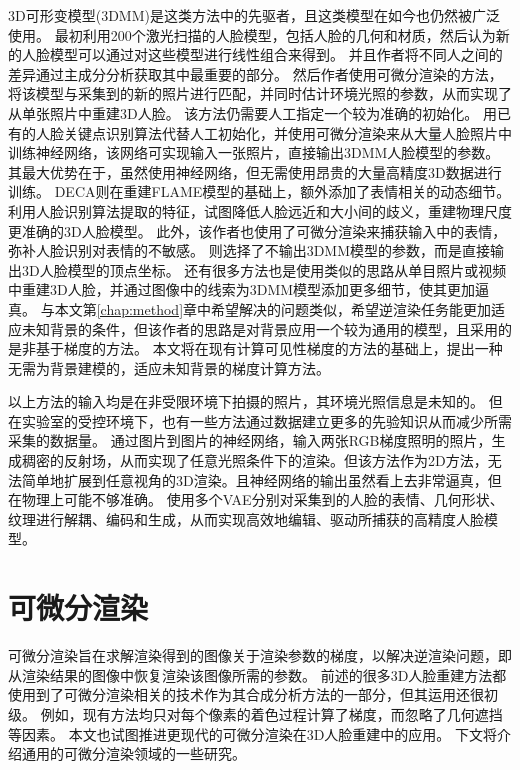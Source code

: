 3D可形变模型(3DMM)是这类方法中的先驱者，且这类模型在如今也仍然被广泛使用。
最初\citet{3DMM}利用200个激光扫描的人脸模型，包括人脸的几何和材质，然后认为新的人脸模型可以通过对这些模型进行线性组合来得到。
并且作者将不同人之间的差异通过主成分分析获取其中最重要的部分。
然后作者使用可微分渲染的方法，将该模型与采集到的新的照片进行匹配，并同时估计环境光照的参数，从而实现了从单张照片中重建3D人脸。
该方法仍需要人工指定一个较为准确的初始化。
\citet{deep3d}用已有的人脸关键点识别算法代替人工初始化，并使用可微分渲染来从大量人脸照片中训练神经网络，该网络可实现输入一张照片，直接输出3DMM人脸模型的参数。其最大优势在于，虽然使用神经网络，但无需使用昂贵的大量高精度3D数据进行训练。
DECA\citep{DECA}则在重建FLAME模型的基础上，额外添加了表情相关的动态细节。
\citet{ZielonkaBT22}利用人脸识别算法提取的特征，试图降低人脸远近和大小间的歧义，重建物理尺度更准确的3D人脸模型。
此外，该作者也使用了可微分渲染来捕获输入中的表情，弥补人脸识别对表情的不敏感。
\citet{1022667848.nh,feng2018prn}则选择了不输出3DMM模型的参数，而是直接输出3D人脸模型的顶点坐标。
还有很多方法\citep{GarridoVWT13,CaoBZB15,ShiWTC14,IchimBP15}也是使用类似的思路从单目照片或视频中重建3D人脸，并通过图像中的线索为3DMM模型添加更多细节，使其更加逼真。
\citet{SchonbornEFV15}与本文第\ref{chap:method}章中希望解决的问题类似，希望逆渲染任务能更加适应未知背景的条件，但该作者的思路是对背景应用一个较为通用的模型，且采用的是非基于梯度的方法。
本文将在现有计算可见性梯度的方法的基础上，提出一种无需为背景建模的，适应未知背景的梯度计算方法。

以上方法的输入均是在非受限环境下拍摄的照片，其环境光照信息是未知的。
但在实验室的受控环境下，也有一些方法通过数据建立更多的先验知识从而减少所需采集的数据量。
\citet{MekaHPZFFKYBDDB19}通过图片到图片的神经网络，输入两张RGB梯度照明的照片，生成稠密的反射场，从而实现了任意光照条件下的渲染。但该方法作为2D方法，无法简单地扩展到任意视角的3D渲染。且神经网络的输出虽然看上去非常逼真，但在物理上可能不够准确。
\citet{ZhangZZLCYXY22}使用多个VAE分别对采集到的人脸的表情、几何形状、纹理进行解耦、编码和生成，从而实现高效地编辑、驱动所捕获的高精度人脸模型。

\section{可微分渲染}

可微分渲染旨在求解渲染得到的图像关于渲染参数的梯度，以解决逆渲染问题，即从渲染结果的图像中恢复渲染该图像所需的参数。
前述的很多3D人脸重建方法都使用到了可微分渲染相关的技术作为其合成分析方法的一部分，但其运用还很初级。
例如，现有方法均只对每个像素的着色过程计算了梯度，而忽略了几何遮挡等因素。
本文也试图推进更现代的可微分渲染在3D人脸重建中的应用。
下文将介绍通用的可微分渲染领域的一些研究。

